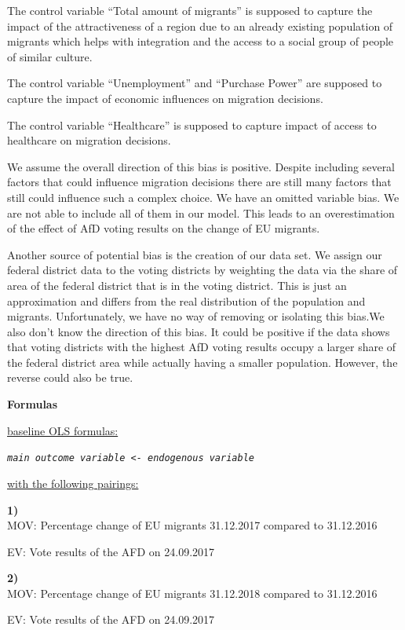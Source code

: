 \documentclass[
  letterpaper,
  DIV=11,
  numbers=noendperiod]{scrartcl}
\begin{document}
The control variable ``Total amount of migrants'' is supposed to capture
the impact of the attractiveness of a region due to an already existing
population of migrants which helps with integration and the access to a
social group of people of similar culture.

The control variable ``Unemployment'' and ``Purchase Power'' are
supposed to capture the impact of economic influences on migration
decisions.

The control variable ``Healthcare'' is supposed to capture impact of
access to healthcare on migration decisions.

We assume the overall direction of this bias is positive. Despite
including several factors that could influence migration decisions there
are still many factors that still could influence such a complex choice.
We have an omitted variable bias. We are not able to include all of them
in our model. This leads to an overestimation of the effect of AfD
voting results on the change of EU migrants.

Another source of potential bias is the creation of our data set. We
assign our federal district data to the voting districts by weighting
the data via the share of area of the federal district that is in the
voting district. This is just an approximation and differs from the real
distribution of the population and migrants. Unfortunately, we have no
way of removing or isolating this bias.We also don't know the direction
of this bias. It could be positive if the data shows that voting
districts with the highest AfD voting results occupy a larger share of
the federal district area while actually having a smaller population.
However, the reverse could also be true.

\textbf{Formulas}

\ul{baseline OLS formulas:}

\emph{\texttt{main\ outcome\ variable\ \textless{}-\ endogenous\ variable}}

\ul{with the following pairings:}

\textbf{1)}\\
MOV: Percentage change of EU migrants 31.12.2017 compared to 31.12.2016

EV: Vote results of the AFD on 24.09.2017

\textbf{2)}\\
MOV: Percentage change of EU migrants 31.12.2018 compared to 31.12.2016

EV: Vote results of the AFD on 24.09.2017
\end{document}
